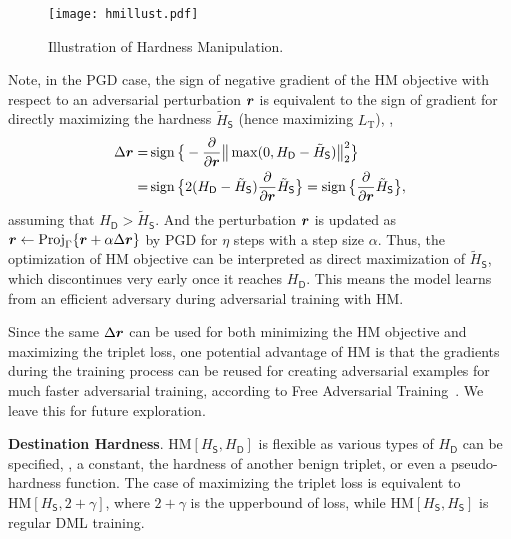 \documentclass[10pt,twocolumn,letterpaper]{article}
\begin{document}
\begin{figure}
	\texttt{[image: hmillust.pdf]}
	\caption{Illustration of Hardness Manipulation.}
	\label{fig:hm}
\end{figure}


Note, in the PGD case, the sign of negative gradient of the HM objective with
respect to an adversarial perturbation ${\bm{r}}$ is equivalent to the sign of
gradient for directly maximizing the hardness $\tilde{H}_\mathsf{S}$ (hence
maximizing $L_\text{T}$), \ie,
%
\begin{align}
	\Delta {\bm{r}}
	=&
	\operatorname{sign}\big\{
		-\frac{\partial}{\partial {\bm{r}}} \big\| \max(0, 
		H_\mathsf{D} - \tilde{H}_\mathsf{S} ) \big\|_2^2
	\big\}
	\\
	=&
	\operatorname{sign}\big\{
		2(H_\mathsf{D} - \tilde{H}_\mathsf{S})
		\frac{\partial }{\partial {\bm{r}}} \tilde{H}_\mathsf{S} \big\}
	=
	\operatorname{sign}\big\{
		\frac{\partial}{\partial {\bm{r}}} \tilde{H}_\mathsf{S}
		\big\},
\end{align}
%
assuming that $H_\mathsf{D}>\tilde{H}_\mathsf{S}$.
%
And the perturbation ${\bm{r}}$ is updated as ${\bm{r}} \leftarrow \text{Proj}_\Gamma\{{\bm{r}} + \alpha \Delta
{\bm{r}}\}$ by PGD for $\eta$ steps with a step size $\alpha$.
%
Thus, the optimization of HM objective can be interpreted as direct
maximization of $\tilde{H}_\mathsf{S}$, which discontinues very early once it
reaches $H_\mathsf{D}$.
%
This means the model learns from an efficient adversary during adversarial
training with HM.

Since the same $\Delta{\bm{r}}$ can be used for both minimizing the HM objective
and maximizing the triplet loss, one potential advantage of HM is that
the gradients during the training process can be reused for creating
adversarial examples for much faster adversarial training, according to 
Free Adversarial Training~\cite{freeat}.
%
We leave this for future exploration.


\textbf{Destination Hardness}.
%
$\text{HM}[H_\mathsf{S},H_\mathsf{D}]$ is flexible as various
types of $H_\mathsf{D}$ can be specified, \eg, a constant, the
hardness of another benign triplet, or even a pseudo-hardness function.
%
The case of maximizing the triplet loss is equivalent to
$\text{HM}[H_\mathsf{S},2+\gamma]$, where $2+\gamma$ is the 
upperbound of loss, while $\text{HM}[H_\mathsf{S},H_\mathsf{S}]$
is regular DML training.
\end{document}
